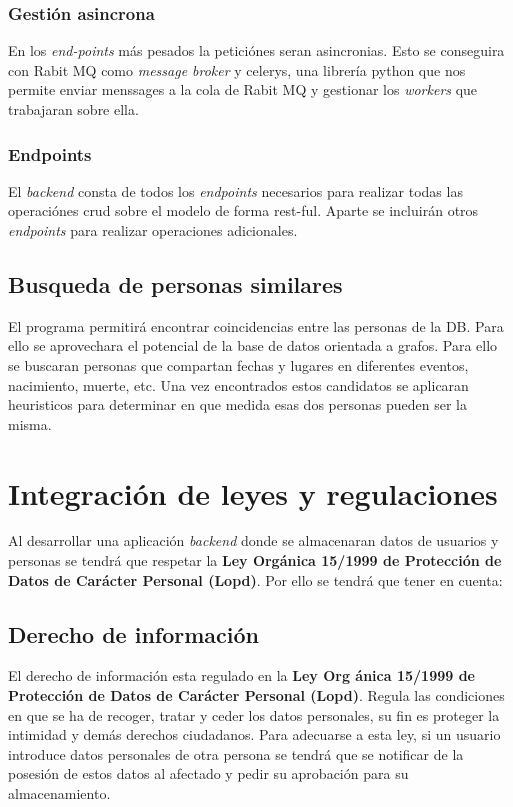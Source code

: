 \documentclass[12pt]{article} %
\begin{document}
\subsubsection*{Gestión asincrona}
En los \textit{end-points} más pesados la peticiónes seran asincronias. Esto se conseguira con Rabit MQ como \textit{message broker} y celerys, una librería python que nos permite enviar menssages a la cola de Rabit MQ y gestionar los \textit{workers} que trabajaran sobre ella.

\subsubsection*{Endpoints}
El \textit{backend} consta de todos los \textit{endpoints} necesarios para realizar todas las operaciónes crud sobre el modelo de forma rest-ful. Aparte se incluirán otros \textit{endpoints} para realizar  operaciones adicionales.

\subsection{Busqueda de personas similares}
El programa permitirá encontrar coincidencias entre las personas de la DB. Para ello se aprovechara el potencial de la base de datos orientada a grafos. Para ello se buscaran personas que compartan fechas y lugares en diferentes eventos, nacimiento, muerte, etc. Una vez encontrados estos candidatos se aplicaran heuristicos para determinar en que medida esas dos personas pueden ser la misma.


\section{Integración de leyes y regulaciones}
Al desarrollar una aplicación \textit{backend} donde se almacenaran datos de usuarios y personas se tendrá que respetar la \textbf{Ley Orgánica 15/1999 de Protección de Datos de Carácter Personal (Lopd)}. Por ello se tendrá que tener en cuenta:

\subsection{Derecho de información}
El derecho de información esta regulado en la \textbf{Ley Org
ánica 15/1999 de Protección de Datos de Carácter Personal (Lopd)}. Regula las condiciones en que se ha  de recoger, tratar y ceder los datos personales, su fin es proteger la intimidad y demás derechos ciudadanos. Para adecuarse a esta ley, si un usuario introduce datos personales de otra persona se tendrá que se notificar de la posesión de estos datos al afectado y pedir su aprobación para su almacenamiento.
\end{document}
